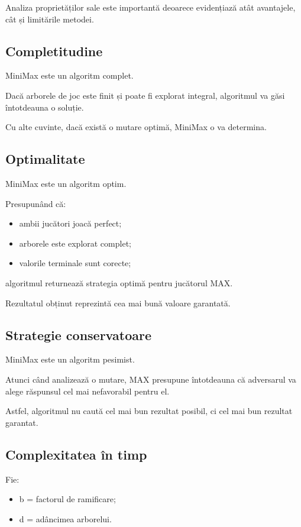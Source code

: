 \documentclass[12pt,a4paper]{article}
\begin{document}
Analiza proprietăților sale este importantă deoarece evidențiază atât avantajele, cât și limitările metodei.

\subsection{Completitudine}

MiniMax este un algoritm complet.

Dacă arborele de joc este finit și poate fi explorat integral, algoritmul va găsi întotdeauna o soluție.

Cu alte cuvinte, dacă există o mutare optimă, MiniMax o va determina.

\subsection{Optimalitate}

MiniMax este un algoritm optim.

Presupunând că:

\begin{itemize}
\item ambii jucători joacă perfect;
\item arborele este explorat complet;
\item valorile terminale sunt corecte;
\end{itemize}

algoritmul returnează strategia optimă pentru jucătorul MAX.

Rezultatul obținut reprezintă cea mai bună valoare garantată.

\subsection{Strategie conservatoare}

MiniMax este un algoritm pesimist.

Atunci când analizează o mutare, MAX presupune întotdeauna că adversarul va alege răspunsul cel mai nefavorabil pentru el.

Astfel, algoritmul nu caută cel mai bun rezultat posibil, ci cel mai bun rezultat garantat.

\subsection{Complexitatea în timp}

Fie:

\begin{itemize}
\item b = factorul de ramificare;
\item d = adâncimea arborelui.
\end{itemize}
\end{document}
